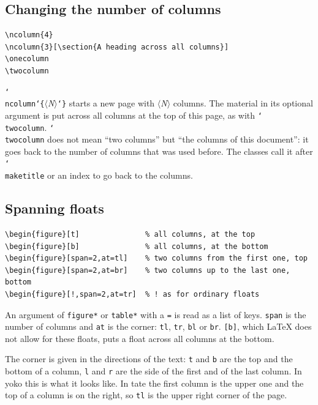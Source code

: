 \documentclass{article}
\newcommand*\cs[1]{\texttt{\char`\\#1}}
\newcommand*\key[1]{\texttt{#1}}
\newcommand*\meta[1]{$\langle$\textit{#1}$\rangle$}
\newcommand*\marg[1]{\texttt{\char`\{}#1\texttt{\char`\}}}
\begin{document}
\subsection{Changing the number of columns}

\begin{verbatim}
\ncolumn{4}
\ncolumn{3}[\section{A heading across all columns}]
\onecolumn
\twocolumn
\end{verbatim}
\cs{ncolumn}\marg{\meta{N}} starts a new page with
\meta{N} columns.  The material in its optional argument is put across
all columns at the top of this page, as with \cs{twocolumn}.
\cs{twocolumn} does not mean ``two columns'' but ``the columns of this
document'': it goes back to the number of columns that was used
before.  The classes call it after \cs{maketitle} or an index to go
back to the columns.

\subsection{Spanning floats}

\begin{verbatim}
\begin{figure}[t]               % all columns, at the top
\begin{figure}[b]               % all columns, at the bottom
\begin{figure}[span=2,at=tl]    % two columns from the first one, top
\begin{figure}[span=2,at=br]    % two columns up to the last one, bottom
\begin{figure}[!,span=2,at=tr]  % ! as for ordinary floats
\end{verbatim}
An argument of \texttt{figure*} or \texttt{table*} with a \texttt{=}
is read as a list of keys.  \key{span} is the number of columns and
\key{at} is the corner: \key{tl}, \key{tr}, \key{bl} or \key{br}.
\texttt{[b]}, which \LaTeX{} does not allow for these floats, puts a
float across all columns at the bottom.

The corner is given in the directions of the text: \key{t} and \key{b}
are the top and the bottom of a column, \key{l} and \key{r} are the
side of the first and of the last column.  In yoko this is what it
looks like.  In tate the first column is the upper one and the top of
a column is on the right, so \key{tl} is the upper right corner of
the page.
\end{document}
